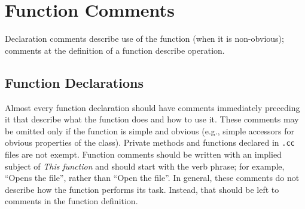 
\section{Function Comments}\label{sec:function-comments}
Declaration comments describe use of the function (when it is non-obvious); comments at the definition of a function describe operation.
    \subsection{Function Declarations}
    Almost every function declaration should have comments immediately preceding it that describe what the function does and how to use it. These comments may be omitted only if the function is simple and obvious (e.g., simple accessors for obvious properties of the class). Private methods and functions declared in \texttt{.cc} files are not exempt. Function comments should be written with an implied subject of \emph{This function} and should start with the verb phrase; for example, \enquote{Opens the file}, rather than \enquote{Open the file}. In general, these comments do not describe how the function performs its task. Instead, that should be left to comments in the function definition.

